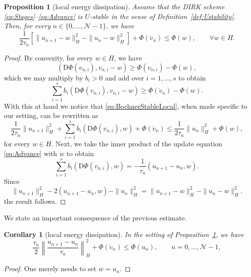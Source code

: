\documentclass{amsart}
\newcommand{\bftau}{{\boldsymbol{\tau}}}
\newcommand{\mclN}{\mathcal{N}}
\newtheorem{corollary}{Corollary}[section]
\newtheorem{proposition}{Proposition}[section]
\theoremstyle{definition}
\newcommand{\diff}{\mathrm{d}}
\newcommand{\Diff}{\mathrm{D}}
\newcommand{\AJS}[1]{#1}
\begin{document}
\begin{proposition}[local energy dissipation]
\label{prop:LocEnergyDissipationGradFlows}
  Assume that the DIRK scheme \eqref{eq:Stages}--\eqref{eq:Advance} is $U$-stable in the sense of Definition~\ref{def:Ustability}. Then, for every $n \in \{ 0, \ldots, \mclN-1\}$, we have
  \[
    \frac1{2\tau_n} \left[ \| u_{n+1} - w\|_H^2 - \| u_n - w \|_{\AJS{H}}^2 \right] + \Phi(\mathring{v}_n) \leq \Phi(w), \qquad \forall w \in H.
  \]
\end{proposition}
\begin{proof}
  By convexity, for every $w \in H$, we have
  \[
    \left( \Diff\Phi(v_{n,i}), v_{n,i}-w \right) \geq \Phi(v_{n,i}) - \Phi(w),
  \]
  which we may multiply by $b_i>0$ and add over $i=1,\ldots,s$ to obtain
  \[
    \sum_{i=1}^s b_i \left( \Diff\Phi(v_{n,i}), v_{n,i}-w \right) \geq \Phi( \mathring{v}_n ) - \Phi(w).
  \]
  With this at hand \AJS{we notice that \eqref{eq:BochnerStableLocal},} when made specific to our setting, can be rewritten as
  \[
    \frac1{2\tau_n}\| u_{n+1}\|_H^2 + \sum_{i=1}^s b_i \left( \Diff \Phi(v_{n,i}), w \right) + \Phi( \mathring{v}_n ) \leq \frac1{2\tau_n}\| u_{n}\|_H^2 + \Phi(w),
  \]
  for every $w \in H$. Next, we take the inner product of the update equation \eqref{eq:Advance} with $w$ to obtain
  \[
    \sum_{i=1}^s b_i \left( \Diff \Phi(v_{n,i}), w \right) = -\frac1{\tau_n} \left( u_{n+1} - u_n,w \right).
  \]
  Since
  \[
    \| u_{n+1}\|_H^2 - 2\left( u_{n+1} - u_n,w \right) - \| u_{n}\|_H^2 = \| u_{n+1} - w \|_{\AJS{H}}^2 - \| u_n - w\|_{\AJS{H}}^2.
  \]
  the result follows.
\end{proof}

We state an important consequence of the previous estimate.

\begin{corollary}[local energy dissipation]
\label{cor:LocalEnergyDissipation}
  In the setting of Proposition~\ref{prop:LocEnergyDissipationGradFlows}, we have
  \[
    \frac{\tau_n}2 \left\| \frac{u_{n+1}-u_n}{\tau_n} \right\|_H^2 + \Phi(\mathring{v}_{n}) \leq \Phi(u_n), \qquad n = 0, \ldots, \mclN-1,
  \]
\end{corollary}
\begin{proof}
  One merely needs to set $w = u_n$.
\end{proof}

\end{document}
